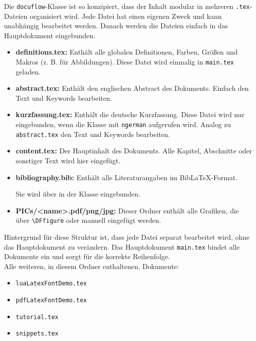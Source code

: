 Die \texttt{docuflow}-Klasse ist so konzipiert, dass der Inhalt modular in mehreren 
\texttt{.tex}-Dateien organisiert wird. Jede Datei hat einen eigenen Zweck und kann unabhängig 
bearbeitet werden. Danach werden die Dateien einfach in das Hauptdokument eingebunden.

\begin{itemize}
    \item \textbf{definitions.tex:}  
    Enthält alle globalen Definitionen, Farben, Größen und Makros (z. B. für Abbildungen). 
    Diese Datei wird einmalig in \texttt{main.tex} geladen.

    \item \textbf{abstract.tex:}  
    Enthält den englischen Abstract des Dokuments. 
    Einfach den Text und Keywords bearbeiten.

    \item \textbf{kurzfassung.tex:}  
    Enthält die deutsche Kurzfassung. Diese Datei wird nur eingebunden, wenn die Klasse mit 
    \texttt{ngerman} aufgerufen wird. Analog zu \verb|abstract.tex| den Text und Keywords bearbeiten.

    \item \textbf{content.tex:}  
    Der Hauptinhalt des Dokuments. Alle Kapitel, Abschnitte oder sonstiger Text wird hier eingefügt.  

    \item \textbf{bibliography.bib:}  
    Enthält alle Literaturangaben im BibLaTeX-Format. 
    
    Sie wird über \verb|| in der Klasse eingebunden.

    \item \textbf{PICs/\textless name\textgreater.pdf/png/jpg:}  
    Dieser Ordner enthält alle Grafiken, die über \verb|\DFfigure| oder manuell eingefügt werden.
\end{itemize}

\noindent
Hintergrund für diese Struktur ist, dass jede Datei separat bearbeitet wird, 
ohne das Hauptdokument zu verändern. Das Hauptdokument \texttt{main.tex} bindet 
alle Dokumente ein und sorgt für die korrekte Reihenfolge.\\

Alle weiteren, in diesem Ordner enthaltenen, Dokumente:

\begin{itemize}[noitemsep]
    \item \verb|luaLatexFontDemo.tex| 
    \item \verb|pdfLatexFontDemo.tex| 
    \item \verb|tutorial.tex| 
    \item \verb|snippets.tex|
\end{itemize}

